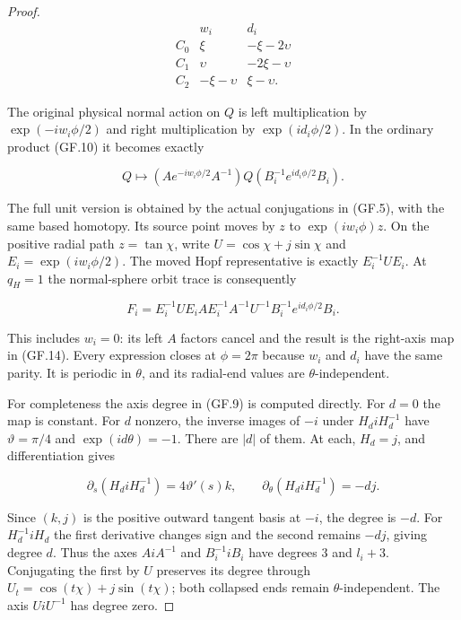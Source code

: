 \begin{proof}
\[
\begin{array}{c|rr}
 &w_i&d_i\\ \hline
 C_0&\xi&-\xi-2\upsilon\\
 C_1&\upsilon&-2\xi-\upsilon\\
 C_2&-\xi-\upsilon&\xi-\upsilon.
\end{array}                                                   \tag{GF.13}
\]

The original physical normal action on \(Q\) is left multiplication
by \(\exp(-iw_i\phi/2)\) and right multiplication by \(\exp(id_i\phi/2)\).
In the ordinary product (GF.10) it becomes exactly

\[
 Q\longmapsto
 (A e^{-iw_i\phi/2}A^{-1})Q
                 (B_i^{-1}e^{id_i\phi/2}B_i).         \tag{GF.14}
\]

The full unit version is obtained by the actual conjugations in
(GF.5), with the same based homotopy. Its source point moves by
\(z\) to \(\exp(iw_i\phi)z\). On the positive radial path \(z=\tan\chi\),
write \(U=\cos\chi+j\sin\chi\) and \(E_i=\exp(iw_i\phi/2)\). The moved
Hopf representative is exactly \(E_i^{-1}UE_i\). At \(q_H=1\) the
normal-sphere orbit trace is consequently

\[
 F_i=E_i^{-1}UE_i A E_i^{-1}A^{-1}U^{-1}
                       B_i^{-1}e^{id_i\phi/2}B_i.     \tag{GF.15}
\]

This includes \(w_i=0\): its left \(A\) factors cancel and the result is
the right-axis map in (GF.14). Every expression closes at \(\phi=2\pi\)
because \(w_i\) and \(d_i\) have the same parity. It is periodic in \(\theta\),
and its radial-end values are \(\theta\)-independent.

For completeness the axis degree in (GF.9) is computed directly.
For \(d=0\) the map is constant. For \(d\) nonzero, the inverse images
of \(-i\) under \(H_diH_d^{-1}\) have \(\vartheta=\pi/4\) and \(\exp(id\theta)=-1\).
There are \(|d|\) of them. At each, \(H_d=j\), and differentiation gives

\[
 \partial_s(H_diH_d^{-1})=4\vartheta'(s)k,\qquad
 \partial_\theta(H_diH_d^{-1})=-d j.
\]

Since \((k,j)\) is the positive outward tangent basis at \(-i\), the
degree is \(-d\). For \(H_d^{-1}iH_d\) the first derivative changes
sign and the second remains \(-dj\), giving degree \(d\).
Thus the axes \(AiA^{-1}\) and \(B_i^{-1}iB_i\) have degrees
\(3\) and \(l_i+3\). Conjugating the first by \(U\) preserves its degree
through \(U_t=\cos(t\chi)+j\sin(t\chi)\); both collapsed ends remain
\(\theta\)-independent. The axis \(UiU^{-1}\) has degree zero.


\end{proof}
